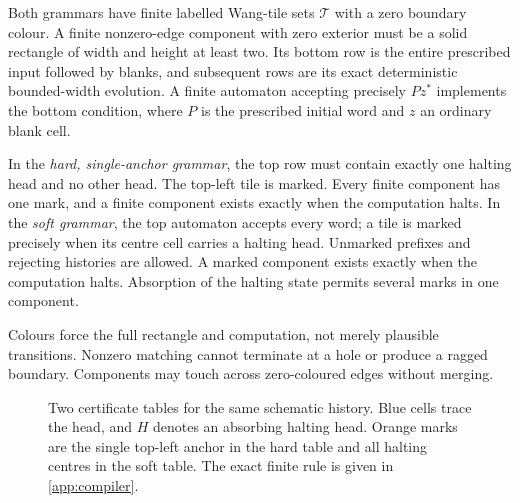 \documentclass[11pt,reqno]{amsart}
\numberwithin{equation}{section}
\theoremstyle{definition}
\theoremstyle{remark}
\newcommand{\cT}{\mathcal T}
\begin{document}
Both grammars have finite labelled Wang-tile sets $\cT$ with a zero boundary colour. A finite nonzero-edge component with zero exterior must be a solid rectangle of width and height at least two. Its bottom row is the entire prescribed input followed by blanks, and subsequent rows are its exact deterministic bounded-width evolution. A finite automaton accepting precisely $Pz^*$ implements the bottom condition, where $P$ is the prescribed initial word and $z$ an ordinary blank cell.

In the \emph{hard, single-anchor grammar}, the top row must contain exactly one halting head and no other head. The top-left tile is marked. Every finite component has one mark, and a finite component exists exactly when the computation halts. In the \emph{soft grammar}, the top automaton accepts every word; a tile is marked precisely when its centre cell carries a halting head. Unmarked prefixes and rejecting histories are allowed. A marked component exists exactly when the computation halts. Absorption of the halting state permits several marks in one component.

Colours force the full rectangle and computation, not merely plausible transitions. Nonzero matching cannot terminate at a hole or produce a ragged boundary. Components may touch across zero-coloured edges without merging.

\begin{figure}[ht]
\centering
{}
\caption{Two certificate tables for the same schematic history. Blue cells trace the head, and $H$ denotes an absorbing halting head. Orange marks are the single top-left anchor in the hard table and all halting centres in the soft table. The exact finite rule is given in \cref{app:compiler}.}
\label{fig:histories}
\end{figure}
\end{document}
